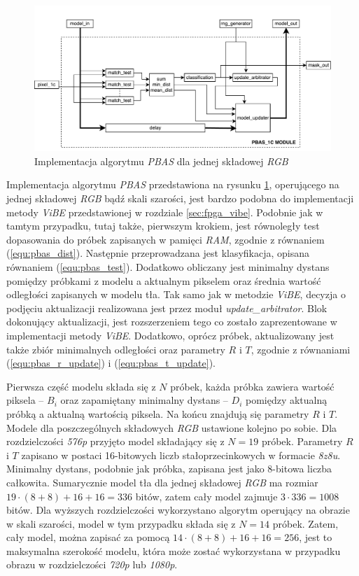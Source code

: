 	\begin{figure}[h!]
		\centering
		\includegraphics[scale=0.55]{img/4/pbas_1c.pdf}
		\caption{Implementacja algorytmu \textit{PBAS} dla jednej składowej \textit{RGB}}
		\label{fig:pbas_1c_diagram}
	\end{figure}	
	
Implementacja algorytmu \textit{PBAS} przedstawiona na rysunku \ref{fig:pbas_1c_diagram}, operującego na jednej składowej \textit{RGB} bądź skali szarości, jest bardzo podobna do implementacji metody \textit{ViBE} przedstawionej w rozdziale \ref{sec:fpga_vibe}. Podobnie jak w tamtym przypadku, tutaj także, pierwszym krokiem, jest równoległy test dopasowania do próbek zapisanych w pamięci \textit{RAM}, zgodnie z równaniem (\ref{equ:pbas_dist}). Następnie przeprowadzana jest klasyfikacja, opisana równaniem (\ref{equ:pbas_test}). Dodatkowo obliczany jest minimalny dystans pomiędzy próbkami z modelu a aktualnym pikselem oraz średnia wartość odległości zapisanych w modelu tła. Tak samo jak w metodzie \textit{ViBE}, decyzja o podjęciu aktualizacji realizowana jest przez moduł \textit{update\_arbitrator}. Blok dokonujący aktualizacji, jest rozszerzeniem tego co zostało zaprezentowane w implementacji metody \textit{ViBE}. Dodatkowo, oprócz próbek, aktualizowany jest także zbiór minimalnych odległości oraz parametry $R$ i $T$, zgodnie z równaniami (\ref{equ:pbas_r_update}) i (\ref{equ:pbas_t_update}).

Pierwsza część modelu składa się z $N$ próbek, każda próbka zawiera wartość piksela -- $B_i$ oraz zapamiętany minimalny dystans -- $D_i$ pomiędzy aktualną próbką a aktualną wartością piksela. Na końcu znajdują się parametry $R$ i $T$. Modele dla poszczególnych składowych \textit{RGB} ustawione kolejno po sobie. Dla rozdzielczości \textit{576p} przyjęto model składający się z $N=19$ próbek. Parametry $R$ i $T$ zapisano w postaci 16-bitowych liczb stałoprzecinkowych w formacie \textit{8z8u}. Minimalny dystans, podobnie jak próbka, zapisana jest jako 8-bitowa liczba całkowita. Sumarycznie model tła dla jednej składowej \textit{RGB} ma rozmiar $19 \cdot (8+8) + 16 + 16 = 336$ bitów, zatem cały model zajmuje $3 \cdot 336 = 1008$ bitów. Dla wyższych rozdzielczości wykorzystano algorytm operujący na obrazie w skali szarości, model w tym przypadku składa się z $N=14$ próbek. Zatem, cały model, można zapisać za pomocą $14 \cdot (8+8) + 16 + 16 = 256$, jest to maksymalna szerokość modelu, która może zostać wykorzystana w przypadku obrazu w rozdzielczości \textit{720p} lub \textit{1080p}. 


